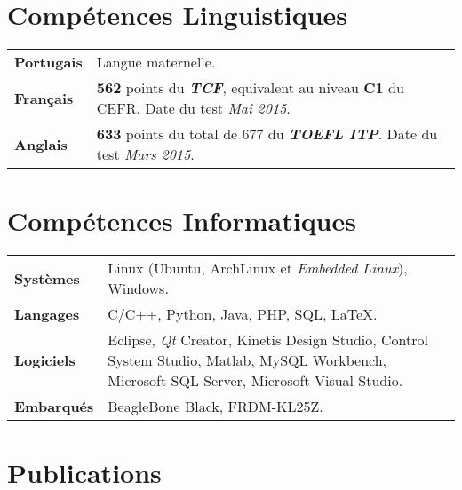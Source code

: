 \documentclass[10pt, a4paper]{article}
\begin{document}



\section{Compétences Linguistiques}

\begin{tabular}{p{} p{}}

\textbf{Portugais} & Langue maternelle.  \\ 

\textbf{Français} & \textbf{562} points du \textbf{\textit{TCF}},
equivalent au niveau \textbf{C1} du CEFR. Date du test \textit{Mai
2015}.\\

\textbf{Anglais} & \textbf{633} points du total de 677 du \textbf{\textit{TOEFL
ITP}}. Date du test \textit{Mars 2015}. \\  

\end{tabular}


\section{Compétences Informatiques} 

\begin{tabular}{p{} p{}}

 \textbf{Systèmes} & Linux (Ubuntu, ArchLinux et \textit{Embedded Linux}),
 Windows.  \\

 \textbf{Langages} & C/C++, Python, Java, PHP,  SQL, \LaTeX. \\ 
 
 \textbf{Logiciels} & Eclipse, \textit{Qt} Creator, Kinetis Design Studio,
 Control System Studio, Matlab, MySQL Workbench, Microsoft SQL Server, Microsoft
 Visual Studio. \\
 
  \textbf{Embarqués} & BeagleBone Black, FRDM-KL25Z. \\
\end{tabular}


\section{Publications}
\end{document}
